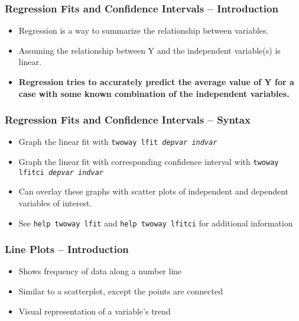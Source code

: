 \documentclass{beamer}
\begin{document}
\begin{frame}
	\frametitle{Regression Fits and Confidence Intervals -- Introduction}
	
	\begin{itemize}
		\item Regression is a way to summarize the relationship between variables.
		\item Assuming the relationship between Y and the independent variable(s) is linear.
		\item \textbf{Regression tries to accurately predict the average value of Y for a case with some known combination of the independent variables.}
	\end{itemize}
\end{frame}

\begin{frame}
	\frametitle{Regression Fits and Confidence Intervals -- Syntax}
	
	\begin{itemize}
		\item Graph the linear fit with \texttt{twoway lfit \textit{depvar} \textit{indvar}}
		\item Graph the linear fit with corresponding confidence interval with \texttt{twoway lfitci \textit{depvar} \textit{indvar}}
		\item Can overlay these graphs with scatter plots of independent and dependent variables of interest.
		\item See \texttt{help twoway lfit} and \texttt{help twoway lfitci} for additional information
	\end{itemize}
\end{frame}

\begin{frame}
	\frametitle{Line Plots -- Introduction}
	
	\begin{itemize}
		\item Shows frequency of data along a number line
		\item Similar to a scatterplot, except the points are connected
		\item Visual representation of a variable's trend
	\end{itemize}
\end{frame}
\end{document}
